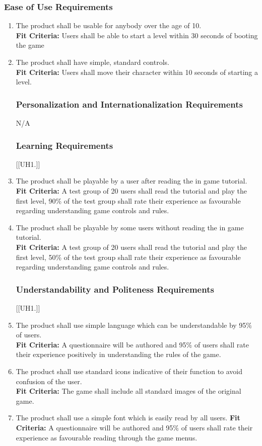 \documentclass[12pt, titlepage]{article}
\begin{document}
\subsubsection{Ease of Use Requirements}
\begin{enumerate}[{UH}1. ]
    \item The product shall be usable for anybody over the age of 10.\\
    \textbf{Fit Criteria:} Users shall be able to start a level within 30 seconds of booting the game
    \item The product shall have simple, standard controls.\\
    \textbf{Fit Criteria:} Users shall move their character within 10 seconds of starting a level.

\subsubsection{Personalization and Internationalization Requirements}
N/A

\subsubsection{Learning Requirements}
[{[{UH}1.]}]
    \item The product shall be playable by a user after reading the in game tutorial.\\
    \textbf{Fit Criteria:} A test group of 20 users shall read the tutorial and play the first level, 90\% of the test group shall rate their experience as favourable regarding understanding game controls and rules.
    \item The product shall be playable by some users without reading the in game tutorial.\\
    \textbf{Fit Criteria:} A test group of 20 users shall read the tutorial and play the first level, 50\% of the test group shall rate their experience as favourable regarding understanding game controls and rules.

\subsubsection{Understandability and Politeness Requirements}
[{[{UH}1.]}]
    \item The product shall use simple language which can be understandable by 95\% of users.\\
    \textbf{Fit Criteria:} A questionnaire will be authored and 95\% of users shall rate their experience positively in understanding the rules of the game.
    \item The product shall use standard icons indicative of their function to avoid confusion of the user.\\
    \textbf{Fit Criteria:} The game shall include all standard images of the original game.
    \item The product shall use a simple font which is easily read by all users.
    \textbf{Fit Criteria:} A questionnaire will be authored and 95\% of users shall rate their experience as favourable reading through the game menus.
\end{enumerate}
\end{document}
